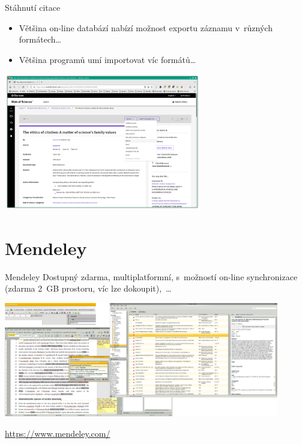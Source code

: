 \documentclass[compress, xelatex, 11pt, xcolor=svgnames, aspectratio=169,
	hyperref={
		bookmarks=true,
		unicode=true,
		colorlinks=true,
		pdftitle={Citacni software},
		plainpages=false,
		pdfauthor={Vojtech Zeisek},
		pdfsubject={Kratky uvod do citacniho software},
		pdfcreator={XeLaTeX},
		pdfkeywords={citace, reference, software, literatura},
		linkcolor=Crimson, %
		anchorcolor=Magenta, %
		citecolor=Magenta, %
		filecolor=Magenta, %
		menucolor=Magenta, %
		urlcolor=DarkTurquoise, %
		},
	url={hyphens, lowtilde} %
	]{beamer}
\begin{document}
\begin{frame}{Stáhnutí citace}
	\begin{itemize}
		\item Většina on-line databází nabízí možnost exportu záznamu v~různých formátech\ldots
		\item Většina programů umí importovat víc formátů\ldots
	\end{itemize}
	\begin{center}
		\includegraphics[height=6cm]{export_z_wos.png}
	\end{center}
\end{frame}

\section{Mendeley}

\begin{frame}{Mendeley}
        Dostupný zdarma, multiplatformní, s~možností on-line synchronizace (zdarma 2~GB prostoru, víc lze dokoupit),~\ldots\\
        \begin{center}
                \includegraphics[height=5cm]{mendeley.png}
        \end{center}
        \flushright\url{https://www.mendeley.com/}
\end{frame}
\end{document}
